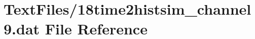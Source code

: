 \hypertarget{18time2histsim__channel9_8dat}{}\section{Text\+Files/18time2histsim\+\_\+channel9.dat File Reference}
\label{18time2histsim__channel9_8dat}
